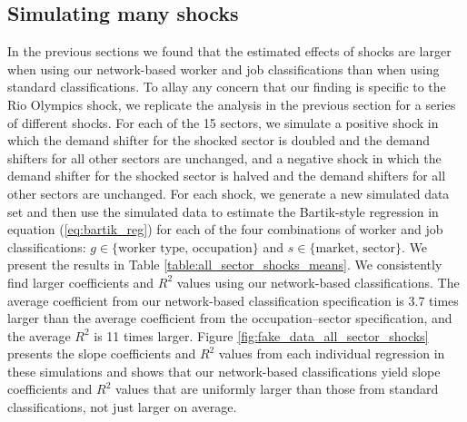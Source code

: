 \documentclass[12pt]{article}
\theoremstyle{definition}
\theoremstyle{plain}
\begin{document}
\subsection{Simulating many shocks}

\label{sec:many_shocks}

In the previous sections we found that the estimated effects of shocks are larger when using our network-based worker and job classifications than when using standard classifications. To allay any concern that our finding is specific to the Rio Olympics shock, we replicate the analysis in the previous section for a series of different shocks. For each of the 15 sectors, we simulate a positive shock in which the demand shifter for the shocked sector is doubled and the demand shifters for all other sectors are unchanged, and a negative shock in which the demand shifter for the shocked sector is halved and the demand shifters for all other sectors are unchanged. For each shock, we generate a new simulated data set and then use the simulated data to estimate the Bartik-style regression in equation (\ref{eq:bartik_reg}) for each of the four combinations of worker and job classifications: $g\in\{\text{worker type, occupation}\}$ and $s\in\{\text{market, sector}\}$. We present the results in Table \ref{table:all_sector_shocks_means}. We consistently find larger coefficients and $R^2$ values using our network-based classifications. The average coefficient from our network-based classification specification is 3.7 times larger than the average coefficient from the occupation--sector specification, and the average $R^2$ is 11 times larger. Figure \ref{fig:fake_data_all_sector_shocks} presents the slope coefficients and $R^2$ values from each individual regression in these simulations and shows that our network-based classifications yield slope coefficients and $R^2$ values that are uniformly larger than those from standard classifications, not just larger on average.



\end{document}
